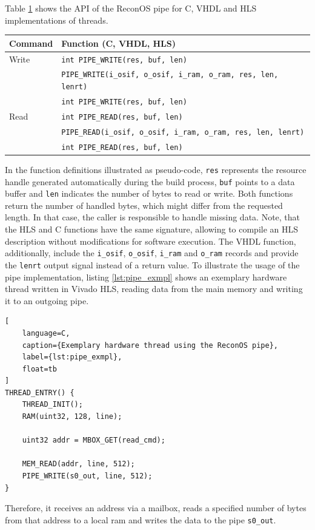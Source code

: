 Table \ref{tab:pipe_api} shows the \ac{API} of the ReconOS pipe for C,
\ac{VHDL} and \ac{HLS} implementations of threads.
\begin{table}
	\scriptsize
	\centering
	\label{tab:pipe_api}
	\begin{tabular}{ll}
	\hline
	\textbf{Command} & \textbf{Function (C, \acs{VHDL}, \acs{HLS})}\\
	\hline
	Write & \lstinline{int PIPE_WRITE(res, buf, len)}\\
	& \lstinline{PIPE_WRITE(i_osif, o_osif, i_ram, o_ram, res, len, lenrt)}\\
	& \lstinline{int PIPE_WRITE(res, buf, len)}\\
	\hline
	Read & \lstinline{int PIPE_READ(res, buf, len)}\\
	& \lstinline{PIPE_READ(i_osif, o_osif, i_ram, o_ram, res, len, lenrt)}\\
	& \lstinline{int PIPE_READ(res, buf, len)}\\
	\hline
	\end{tabular}
\end{table}
In the function definitions illustrated as pseudo-code, \lstinline{res}
represents the resource handle generated automatically during the build
process, \lstinline{buf} points to a data buffer and \lstinline{len} indicates
the number of bytes to read or write. Both functions return the number of
handled bytes, which might differ from the requested length. In that case, the
caller is responsible to handle missing data. Note, that the \ac{HLS} and C
functions have the same signature, allowing to compile an \ac{HLS} description
without modifications for software execution. The \ac{VHDL} function,
additionally, include the \lstinline{i_osif}, \lstinline{o_osif},
\lstinline{i_ram} and \lstinline{o_ram} records and provide the
\lstinline{lenrt} output signal instead of a return value. To illustrate the
usage of the pipe implementation, listing \ref{lst:pipe_exmpl} shows an
exemplary hardware thread written in Vivado HLS, reading data from the main
memory and writing it to an outgoing pipe.
\begin{lstlisting}[
	language=C,
	caption={Exemplary hardware thread using the ReconOS pipe},
	label={lst:pipe_exmpl},
	float=tb
]
THREAD_ENTRY() {
	THREAD_INIT();
	RAM(uint32, 128, line);

	uint32 addr = MBOX_GET(read_cmd);

	MEM_READ(addr, line, 512);
	PIPE_WRITE(s0_out, line, 512);
}
\end{lstlisting}
Therefore, it receives an address via a mailbox, reads a specified number of
bytes from that address to a local ram and writes the data to the pipe
\lstinline{s0_out}.

